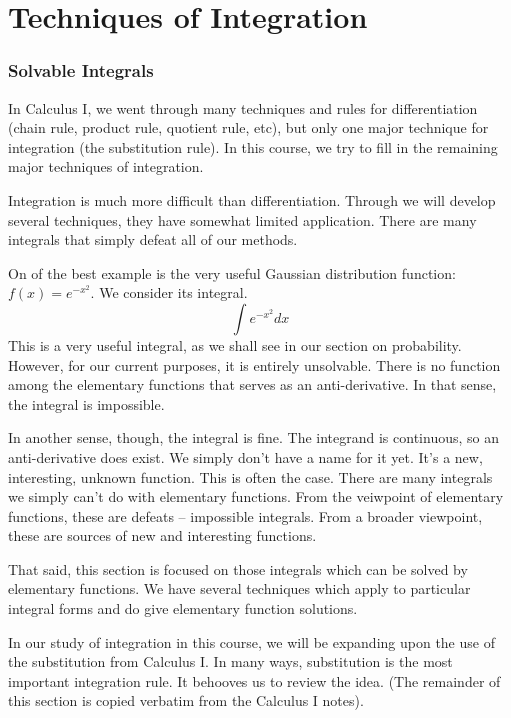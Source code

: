\documentclass[fleqn]{report}
\begin{document}
\chapter{Techniques of Integration}
\label{techniques-integration}

\subsection{Solvable Integrals}
\label{solvable}

In Calculus I, we went through many techniques and rules for
differentiation (chain rule, product rule, quotient rule,
etc), but only one major technique for integration (the
substitution rule). In this course, we try to fill in the
remaining major techniques of integration.

Integration is much more difficult than differentiation. Through
we will develop several techniques, they have somewhat
limited application. There are many integrals that simply
defeat all of our methods. 

\begin{example}
On of the best example is the
very useful Gaussian distribution function: $f(x) = e^{-x^2}$.
We consider its integral.
\begin{equation*}
\int e^{-x^2} dx 
\end{equation*}
This is a very useful integral, as we shall see in our section
on probability. However, for our current purposes, it is
entirely unsolvable. There is no function among the
elementary functions that serves as an anti-derivative. In
that sense, the integral is impossible.

In another sense, though, the integral is fine. The integrand
is continuous, so an anti-derivative does exist. We simply
don't have a name for it yet. It's a new, interesting,
unknown function. This is often the case. There are many
integrals we simply can't do with elementary functions. From
the veiwpoint of elementary functions, these are defeats --
impossible integrals. From a broader viewpoint, these are
sources of new and interesting functions.
\end{example}

That said, this section is focused on those integrals which
can be solved by elementary functions. We have several
techniques which apply to particular integral forms and do
give elementary function solutions.

In our study of integration in this course, we will be
expanding upon the use of the substitution from Calculus I. In
many ways, substitution is the most important integration
rule. It behooves us to review the idea. (The remainder of
this section is copied verbatim from the Calculus I notes).
\end{document}
